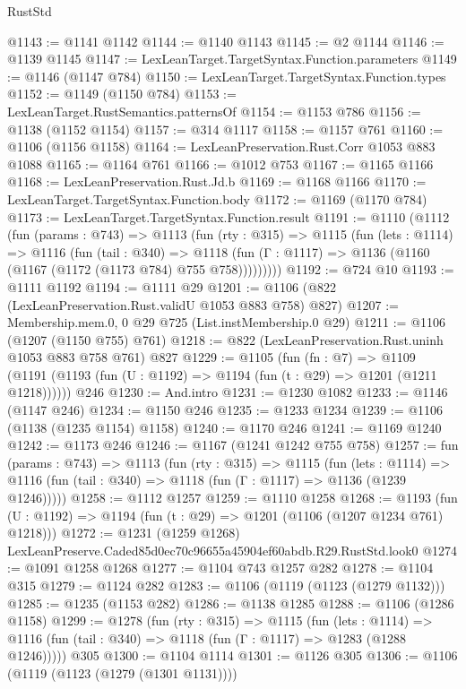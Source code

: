 \begin{lexlean}{RustStd}
\begin{coremodule}
@1143 := @1141 @1142
@1144 := @1140 @1143
@1145 := @2 @1144
@1146 := @1139 @1145
@1147 := LexLeanTarget.TargetSyntax.Function.parameters
@1149 := @1146 (@1147 @784)
@1150 := LexLeanTarget.TargetSyntax.Function.types
@1152 := @1149 (@1150 @784)
@1153 := LexLeanTarget.RustSemantics.patternsOf
@1154 := @1153 @786
@1156 := @1138 (@1152 @1154)
@1157 := @314 @1117
@1158 := @1157 @761
@1160 := @1106 (@1156 @1158)
@1164 := LexLeanPreservation.Rust.Corr @1053 @883 @1088
@1165 := @1164 @761
@1166 := @1012 @753
@1167 := @1165 @1166
@1168 := LexLeanPreservation.Rust.Jd.b
@1169 := @1168 @1166
@1170 := LexLeanTarget.TargetSyntax.Function.body
@1172 := @1169 (@1170 @784)
@1173 := LexLeanTarget.TargetSyntax.Function.result
@1191 := @1110
    (@1112
      (fun (params : @743) =>
      @1113
        (fun (rty : @315) =>
        @1115
          (fun (lets : @1114) =>
          @1116
            (fun (tail : @340) =>
            @1118 (fun (Γ : @1117) => @1136 (@1160 (@1167 (@1172 (@1173 @784) @755 @758)))))))))
@1192 := @724 @10
@1193 := @1111 @1192
@1194 := @1111 @29
@1201 := @1106 (@822 (LexLeanPreservation.Rust.validU @1053 @883 @758) @827)
@1207 := Membership.mem.{0, 0} @29 @725 (List.instMembership.{0} @29)
@1211 := @1106 (@1207 (@1150 @755) @761)
@1218 := @822 (LexLeanPreservation.Rust.uninh @1053 @883 @758 @761) @827
@1229 := @1105
    (fun (fn : @7) =>
    @1109 (@1191 (@1193 (fun (U : @1192) => @1194 (fun (t : @29) => @1201 (@1211 @1218))))))
    @246
@1230 := And.intro
@1231 := @1230 @1082
@1233 := @1146 (@1147 @246)
@1234 := @1150 @246
@1235 := @1233 @1234
@1239 := @1106 (@1138 (@1235 @1154) @1158)
@1240 := @1170 @246
@1241 := @1169 @1240
@1242 := @1173 @246
@1246 := @1167 (@1241 @1242 @755 @758)
@1257 := fun (params : @743) =>
  @1113
    (fun (rty : @315) =>
    @1115
      (fun (lets : @1114) =>
      @1116 (fun (tail : @340) => @1118 (fun (Γ : @1117) => @1136 (@1239 @1246)))))
@1258 := @1112 @1257
@1259 := @1110 @1258
@1268 := @1193 (fun (U : @1192) => @1194 (fun (t : @29) => @1201 (@1106 (@1207 @1234 @761) @1218)))
@1272 := @1231 (@1259 @1268) LexLeanPreserve.Caded85d0ec70c96655a45904ef60abdb.R29.RustStd.look0
@1274 := @1091 @1258 @1268
@1277 := @1104 @743 @1257 @282
@1278 := @1104 @315
@1279 := @1124 @282
@1283 := @1106 (@1119 (@1123 (@1279 @1132)))
@1285 := @1235 (@1153 @282)
@1286 := @1138 @1285
@1288 := @1106 (@1286 @1158)
@1299 := @1278
    (fun (rty : @315) =>
    @1115
      (fun (lets : @1114) =>
      @1116 (fun (tail : @340) => @1118 (fun (Γ : @1117) => @1283 (@1288 @1246)))))
    @305
@1300 := @1104 @1114
@1301 := @1126 @305
@1306 := @1106 (@1119 (@1123 (@1279 (@1301 @1131))))

\end{coremodule}
\end{lexlean}
